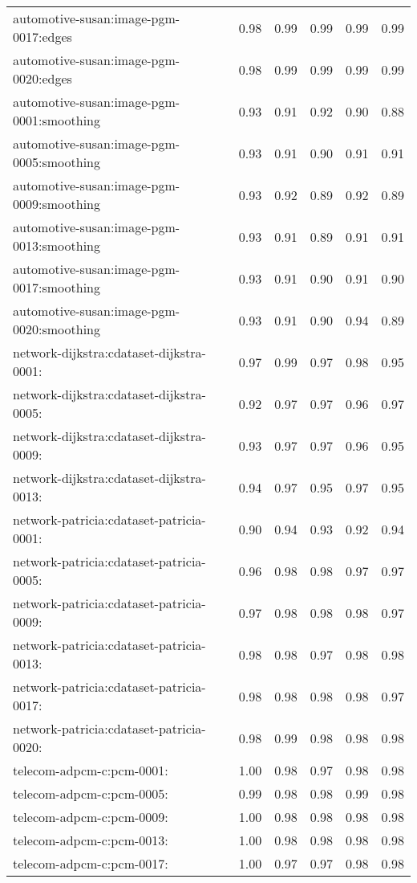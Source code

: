 \begin{longtable}{lrrrrr}
automotive-susan:image-pgm-0017:edges & 0.98 & 0.99 & 0.99 & 0.99 & 0.99 \\
automotive-susan:image-pgm-0020:edges & 0.98 & 0.99 & 0.99 & 0.99 & 0.99 \\
automotive-susan:image-pgm-0001:smoothing & 0.93 & 0.91 & 0.92 & 0.90 & 0.88 \\
automotive-susan:image-pgm-0005:smoothing & 0.93 & 0.91 & 0.90 & 0.91 & 0.91 \\
automotive-susan:image-pgm-0009:smoothing & 0.93 & 0.92 & 0.89 & 0.92 & 0.89 \\
automotive-susan:image-pgm-0013:smoothing & 0.93 & 0.91 & 0.89 & 0.91 & 0.91 \\
automotive-susan:image-pgm-0017:smoothing & 0.93 & 0.91 & 0.90 & 0.91 & 0.90 \\
automotive-susan:image-pgm-0020:smoothing & 0.93 & 0.91 & 0.90 & 0.94 & 0.89 \\
network-dijkstra:cdataset-dijkstra-0001: & 0.97 & 0.99 & 0.97 & 0.98 & 0.95 \\
network-dijkstra:cdataset-dijkstra-0005: & 0.92 & 0.97 & 0.97 & 0.96 & 0.97 \\
network-dijkstra:cdataset-dijkstra-0009: & 0.93 & 0.97 & 0.97 & 0.96 & 0.95 \\
network-dijkstra:cdataset-dijkstra-0013: & 0.94 & 0.97 & 0.95 & 0.97 & 0.95 \\
network-patricia:cdataset-patricia-0001: & 0.90 & 0.94 & 0.93 & 0.92 & 0.94 \\
network-patricia:cdataset-patricia-0005: & 0.96 & 0.98 & 0.98 & 0.97 & 0.97 \\
network-patricia:cdataset-patricia-0009: & 0.97 & 0.98 & 0.98 & 0.98 & 0.97 \\
network-patricia:cdataset-patricia-0013: & 0.98 & 0.98 & 0.97 & 0.98 & 0.98 \\
network-patricia:cdataset-patricia-0017: & 0.98 & 0.98 & 0.98 & 0.98 & 0.97 \\
network-patricia:cdataset-patricia-0020: & 0.98 & 0.99 & 0.98 & 0.98 & 0.98 \\
telecom-adpcm-c:pcm-0001: & 1.00 & 0.98 & 0.97 & 0.98 & 0.98 \\
telecom-adpcm-c:pcm-0005: & 0.99 & 0.98 & 0.98 & 0.99 & 0.98 \\
telecom-adpcm-c:pcm-0009: & 1.00 & 0.98 & 0.98 & 0.98 & 0.98 \\
telecom-adpcm-c:pcm-0013: & 1.00 & 0.98 & 0.98 & 0.98 & 0.98 \\
telecom-adpcm-c:pcm-0017: & 1.00 & 0.97 & 0.97 & 0.98 & 0.98 \\

\end{longtable}
